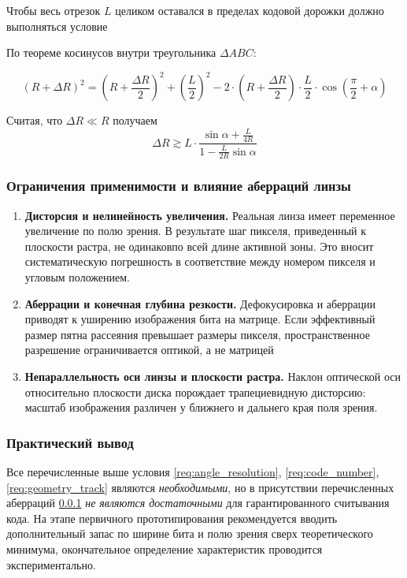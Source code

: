 Чтобы весь отрезок $L$ целиком оставался в пределах кодовой дорожки должно выполняться условие

По теореме косинусов внутри треугольника $\Delta ABC$:

\begin{equation*}
(R+\Delta R)^2 = \left(R+\frac{\Delta R}{2}\right)^2 + \left(\frac{L}{2}\right)^2 -2\cdot\left(R+\frac{\Delta R}{2}\right)\cdot\frac{L}{2}\cdot \cos\left(\frac{\pi}{2}+\alpha\right)    
\end{equation*}

Считая, что $\Delta R \ll R$ получаем
\begin{equation}\label{eq:estimate_dR}
    \boxed{\Delta R \gtrsim L\cdot \dfrac{\sin \alpha + \frac{L}{4R}}{1 - \frac{L}{2R}\sin\alpha}}
\end{equation}

\subsubsection{Ограничения применимости и влияние аберраций линзы}
\label{subsec:lens_imperfections}

\begin{enumerate}
    \item \textbf{Дисторсия и нелинейность увеличения.} Реальная линза имеет переменное увеличение по полю зрения. В результате шаг пикселя, приведенный к плоскости растра, не одинаковпо всей длине активной зоны. Это вносит систематическую погрешность в соответствие между номером пикселя и угловым положением.
    \item \textbf{Аберрации и конечная глубина резкости.} Дефокусировка и аберрации приводят к уширению изображения бита на матрице. Если эффективный размер пятна рассеяния превышает размеры пикселя, пространственное разрешение ограничивается оптикой, а не матрицей
    \item  \textbf{Непараллельность оси линзы и плоскости растра.} Наклон оптической оси относительно плоскости диска порождает трапециевидную дисторсию: масштаб изображения различен у ближнего и дальнего края поля зрения.

\end{enumerate}

\subsubsection{Практический вывод}
Все перечисленные выше условия \ref{req:angle_resolution}, \ref{req:code_number}, \ref{req:geometry_track} являются \textit{необходимыми}, но в присутствии перечисленных аберраций \ref{subsec:lens_imperfections} \textit{не являются достаточными} для гарантированного считывания кода. На этапе первичного прототипирования рекомендуется вводить дополнительный запас по ширине бита и полю зрения сверх теоретического минимума, окончательное определение характеристик проводится экспериментально.
